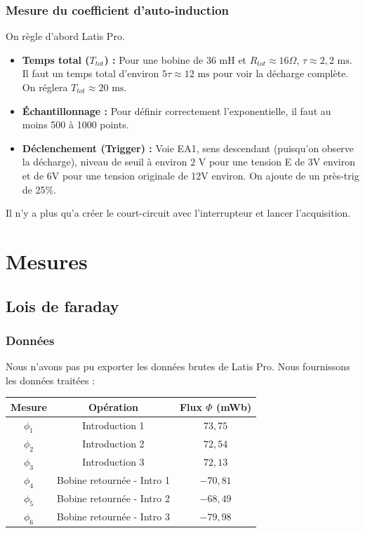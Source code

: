 \documentclass[a4paper,9pt,french]{scrartcl}
\begin{document}
   \subsubsection{Mesure du coefficient d'auto-induction}
   On règle d'abord Latis Pro.
    \begin{itemize}
        \item \textbf{Temps total ($T_{tot}$) :} Pour une bobine de $36 \text{ mH}$ et $R_{tot} \approx 16 \Omega$, $\tau \approx 2,2 \text{ ms}$. Il faut un temps total d'environ $5\tau \approx 12 \text{ ms}$ pour voir la décharge complète. On réglera $T_{tot} \approx 20 \text{ ms}$.
        \item \textbf{Échantillonnage :} Pour définir correctement l'exponentielle, il faut au moins 500 à 1000 points.
        \item \textbf{Déclenchement (Trigger) :} Voie EA1, sens descendant (puisqu'on observe la décharge), niveau de seuil à environ $2 \text{ V}$ pour une tension E de 3V environ et de 6V pour une tension originale de 12V environ. On ajoute de un près-trig de 25\%.
    \end{itemize}
    Il n'y a plus qu'a créer le court-circuit avec l'interrupteur et lancer l'acquisition.
\section{Mesures}
\subsection{Lois de faraday}
\subsubsection{Données}
Nous n'avons pas pu exporter les données brutes de Latis Pro. Nous fournissons les données traitées :

\begin{center}
\begin{tabular}{|c|c|c|}
\hline
\textbf{Mesure} & \textbf{Opération} & \textbf{Flux $\Phi$ (mWb)} \\
\hline
$\phi_1$ & Introduction 1 & $73,75$ \\
$\phi_2$ & Introduction 2 & $72,54$ \\
$\phi_3$ & Introduction 3 & $72,13$ \\
\hline
$\phi_4$ & Bobine retournée - Intro 1 & $-70,81$ \\
$\phi_5$ & Bobine retournée - Intro 2 & $-68,49$ \\
$\phi_6$ & Bobine retournée - Intro 3 & $-79,98$ \\
\hline
\end{tabular}
\end{center}
\end{document}
